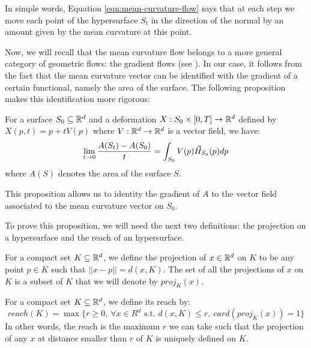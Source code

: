 In simple words, Equation \ref{eqn:mean-curvature-flow} says that at each step
we move each point of the hypersurface $ S_t $ in the direction of the normal by
an amount given by the mean curvature at this point.

Now, we will recall that the mean curvature flow belongs to a more general
category of geometric flows: the gradient flows (see
\cite{ilmanen1998lectures}). In our case, it follows from the fact that the mean
curvature vector can be identified with the gradient of a certain functional,
namely the area of the surface. The following proposition makes this
identification more rigorous:

\begin{proposition}
    For a surface $ S_0 \subseteq \mathbb{R}^d $ and a deformation $ X : S_0 \times [0, T]
    \to \mathbb{R}^d $ defined by $ X(p, t) = p + t V(p) $ where $ V : \mathbb{R}^d \to \mathbb{R}^d $ is a
    vector field, we have:
    \begin{equation}
        \lim\limits_{t \to 0} \frac{A(S_t) - A(S_0)}{t} = \int_{S_0} V(p)
        \vec{H}_{S_0}(p) dp
    \end{equation}
    where $ A(S) $ denotes the area of the surface $ S $.
    \label{prop:gradient-area-functional}
\end{proposition}

This proposition allows us to identity the gradient of $ A $ to the vector
field associated to the mean curvature vector on $ S_0 $.

To prove this proposition, we will need the next two definitions: the projection
on a hypersurface and the reach of an hypersurface.

\begin{definition}
    For a compact set $ K \subseteq \mathbb{R}^d $, we define the projection of $ x \in
    \mathbb{R}^d $ on $ K $ to be any point $ p \in K $ such that $ || x - p || = d(x,
    K) $.
    The set of all the projections of $ x $ on $ K $ is a subset of $ K $
    that we will denote by $ proj_K(x) $.
\end{definition}

\begin{definition}
    For a compact set $ K \subseteq \mathbb{R}^d $, we define its reach by:
    \begin{equation}
        reach(K) = \max \{ r \geq 0,~\forall x \in R^d \text{ s.t. } d(x, K) \leq
        r,~ card(proj_K(x)) = 1 \}
    \end{equation}
    In other words, the reach is the maximum $ r $ we can take such that the
    projection of any $ x  $ at distance smaller than $ r $ of $ K $ is uniquely
    defined on $ K $.
\end{definition}

